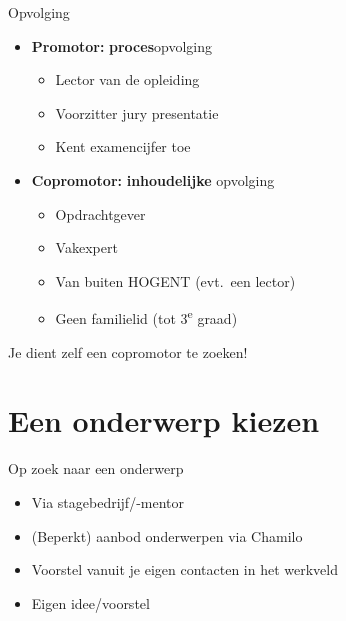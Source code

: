 \documentclass[aspectratio=169]{beamer}
\begin{document}
\begin{frame}{Opvolging}

  \begin{itemize}
    \item \textbf{Promotor:} \textbf{proces}opvolging
          \begin{itemize}
            \item Lector van de opleiding
            \item Voorzitter jury presentatie
            \item Kent examencijfer toe
          \end{itemize}
    \item \textbf{Copromotor:} \textbf{inhoudelijke} opvolging
          \begin{itemize}
            \item Opdrachtgever
            \item Vakexpert
            \item Van buiten HOGENT (evt.\ een lector)
            \item Geen familielid (tot 3\textsuperscript*{e} graad)
          \end{itemize}
  \end{itemize}

  \bigskip

  Je dient zelf een copromotor te zoeken!

\end{frame}

\section{Een onderwerp kiezen}

\begin{frame}{Op zoek naar een onderwerp}

  \begin{itemize}
    \item Via stagebedrijf/-mentor
    \item (Beperkt) aanbod onderwerpen via Chamilo
    \item Voorstel vanuit je eigen contacten in het werkveld
    \item Eigen idee/voorstel
  \end{itemize}

  \bigskip

\end{frame}
\end{document}
